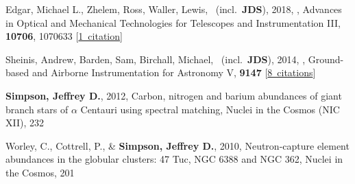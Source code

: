 \item[{\color{numcolor}\scriptsize4}] Edgar, Michael L., Zhelem, Ross, Waller, Lewis, \etal\ (incl.\ \textbf{JDS}), 2018, , Advances in Optical and Mechanical Technologies for Telescopes and Instrumentation III, \textbf{10706}, 1070633 [\href{https://ui.adsabs.harvard.edu/#abs/2018SPIE10706E..33E}{1~citation}]

\item[{\color{numcolor}\scriptsize3}] Sheinis, Andrew, Barden, Sam, Birchall, Michael, \etal\ (incl.\ \textbf{JDS}), 2014, , Ground-based and Airborne Instrumentation for Astronomy V, \textbf{9147} [\href{https://ui.adsabs.harvard.edu/#abs/2014SPIE.9147E..0YS}{8~citations}]

\item[{\color{numcolor}\scriptsize2}] \textbf{Simpson, Jeffrey D.}, 2012, Carbon, nitrogen and barium abundances of giant branch stars of {\ensuremath{\alpha}} Centauri using spectral matching, Nuclei in the Cosmos (NIC XII), 232

\item[{\color{numcolor}\scriptsize1}] Worley, C., Cottrell, P., \& \textbf{Simpson, Jeffrey D.}, 2010, Neutron-capture element abundances in the globular clusters: 47 Tuc, NGC 6388 and NGC 362, Nuclei in the Cosmos, 201
